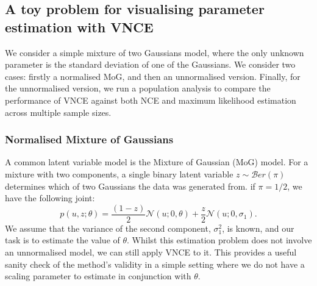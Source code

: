 \documentclass[11pt, oneside]{article}
\newcommand{\pnorm}{p}
\theoremstyle{definition}
\begin{document}
\subsection{A toy problem for visualising parameter estimation with VNCE}
\label{sec:mog}
We consider a simple mixture of two Gaussians model, where the only unknown parameter is the standard deviation of one of the Gaussians. We consider two cases: firstly a normalised MoG, and then an unnormalised version. Finally, for the unnormalised version, we run a population analysis to compare the performance of VNCE against both NCE and maximum likelihood estimation across multiple sample sizes.


\subsubsection{Normalised Mixture of Gaussians}


\noindent A common latent variable model is the Mixture of Gaussian (MoG) model. For a mixture with two components, a single binary latent variable $z \sim \mathcal{B}er(\pi)$ determines which of two Gaussians the data was generated from. if $\pi = 1/2$, we have the following joint:
\begin{equation}
\pnorm(u, z; \theta) = \frac{(1-z)}{2} \mathcal{N}(u; 0, \theta) + \frac{z}{2} \mathcal{N}(u; 0, \sigma_1).
\label{eq:mog standard}
\end{equation}
We assume that the variance of the second component, $\sigma_1^2$, is known, and our task is to estimate the value of $\theta$. Whilst this estimation problem does not involve an unnormalised model, we can still apply VNCE to it. This provides a useful sanity check of the method's validity in a simple setting where we do not have a scaling parameter to estimate in conjunction with $\theta$.
\end{document}
